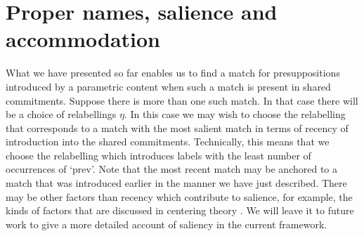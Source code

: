\section{Proper names, salience and accommodation}
\label{sec:accommodation}

What we have presented so far enables us to find a match for
presuppositions introduced by a parametric content when such a match
is present in shared commitments.  Suppose there is more than one such
match.  In that case there will be a choice of relabellings $\eta$.
In this case we may wish to choose the relabelling that corresponds to
a match with the most salient match in terms of recency of
introduction into the shared commitments.  Technically, this means
that we choose the relabelling which introduces labels with the least
number of occurrences of `prev'.  Note that the most recent match may
be anchored to a match that was introduced earlier in the manner we
have just described.  There may be other factors than recency which
contribute to salience, for example, the kinds of factors that are
discussed in centering theory \citep{JoshiWeinstein1981,GroszJoshiWeinstein1983,GroszJoshiWeinstein1995,WalkerJoshiPrince1998,PoesioStevensonEugenioHitzeman2004}.  We will leave it to future work to give a
more detailed account of saliency in the current framework.

